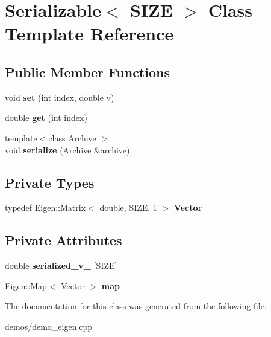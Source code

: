\hypertarget{classSerializable}{}\section{Serializable$<$ S\+I\+ZE $>$ Class Template Reference}
\label{classSerializable}
\subsection*{Public Member Functions}
\begin{DoxyCompactItemize}
\item 
\mbox{\label{classSerializable_a2db7fcfa31d5802fa8c889c41a2295b9}} 
void {\bfseries set} (int index, double v)
\item 
\mbox{\label{classSerializable_a5f762ded2b44a416b362f6dfd9cf9976}} 
double {\bfseries get} (int index)
\item 
\mbox{\label{classSerializable_a442df4ac2ecad585776f620405b8ce0e}} 
{\footnotesize template$<$class Archive $>$ }\\void {\bfseries serialize} (Archive \&archive)
\end{DoxyCompactItemize}
\subsection*{Private Types}
\begin{DoxyCompactItemize}
\item 
\mbox{\label{classSerializable_a41015ba50b004943be3691039863377e}} 
typedef Eigen\+::\+Matrix$<$ double, S\+I\+ZE, 1 $>$ {\bfseries Vector}
\end{DoxyCompactItemize}
\subsection*{Private Attributes}
\begin{DoxyCompactItemize}
\item 
\mbox{\label{classSerializable_abb77ae537c25b7941e041c3239f0085d}} 
double {\bfseries serialized\+\_\+v\+\_\+} \mbox{[}S\+I\+ZE\mbox{]}
\item 
\mbox{\label{classSerializable_af836042e597c021ae7cbb1699c4de2e9}} 
Eigen\+::\+Map$<$ Vector $>$ {\bfseries map\+\_\+}
\end{DoxyCompactItemize}


The documentation for this class was generated from the following file\+:\begin{DoxyCompactItemize}
\item 
demos/demo\+\_\+eigen.\+cpp\end{DoxyCompactItemize}

